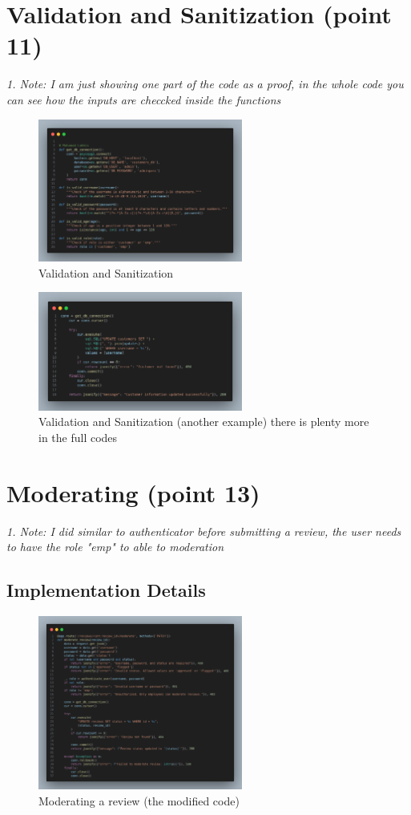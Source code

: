 \documentclass[a4paper,12pt]{article}
\begin{document}
\section{Validation and Sanitization (point 11)}
\textit{1. Note: I am just showing one part of the code as a proof, in the whole code you can see how the inputs are checcked inside the functions}
\begin{figure}[H]
  \centering
  \includegraphics[width=0.6\textwidth]{images/30.png}
  \caption{Validation and Sanitization}
\end{figure}
\begin{figure}[H]
  \centering
  \includegraphics[width=0.6\textwidth]{images/31.png}
  \caption{Validation and Sanitization (another example) there is plenty more in the full codes}
\end{figure}
\section{Moderating (point 13)}
\textit{1. Note: I did similar to authenticator before submitting a review, the user needs to have the role "emp" to able to moderation}
\subsection{Implementation Details}
\begin{figure}[H]
  \centering
  \includegraphics[width=0.6\textwidth]{images/32.png}
  \caption{Moderating a review (the modified code)}
\end{figure}
\end{document}
